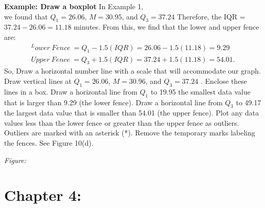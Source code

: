 \documentclass{report}
\begin{document}
     \pagebreak \bigbreak \noindent
     \begin{mdframed}
       \textbf{Example: Draw a boxplot}
       \bigbreak \noindent 
       In Example 1, \\
       we found that $Q_{1} = 26.06 $, $M=30.95 $, and $Q_{3} =37.24$  Therefore, the IQR = $37.24 - 26.06 = 11.18 $ minutes. From this, we find that the lower and upper fence are:
       \begin{align*}^
           Lower\ Fence\ = Q_{1} - 1.5(IQR) = 26.06 - 1.5(11.18)= 9.29 \\
           Upper\ Fence\ = Q_{3} + 1.5(IQR) = 37.24 +1.5(11.18) =54.01
       .\end{align*}
       \bigbreak \noindent 
       So, Draw a horizontal number line with a scale that will accommodate our graph. Draw vertical lines at $Q_{1} =26.06 $, $M=30.96 $, and $Q_{3} =37.24 $ . Enclose these lines in a box. 
       \bigbreak \noindent 
       Draw a horizontal line from $Q_{1} $ to 19.95 the smallest data value that is larger than 9.29 (the lower fence). Draw a horizontal line from $Q_{3} $ to 49.17 the largest data value that is smaller than 54.01 (the upper fence). 
       \bigbreak \noindent 
       Plot any data values less than the lower fence or greater than the upper fence as outliers. Outliers are marked with an asterisk (*). Remove the temporary marks labeling the fences. See Figure 10(d).
     \end{mdframed}

     \bigbreak \noindent 
     \textit{Figure:}
     \bigbreak \noindent 
    \begin{figure}[ht]
        \centering
        \label{fig:box}
    \end{figure}

    \bigbreak \noindent 
    \begin{figure}[ht]
        \centering
        \def\svgwidth{\columnwidth}
        \label{fig:box2}
    \end{figure}

    \bigbreak \noindent 
    \pagebreak \bigbreak \noindent
    \pagebreak \bigbreak \noindent
    \section{Chapter 4:}
    \bigbreak \noindent 
\end{document}
